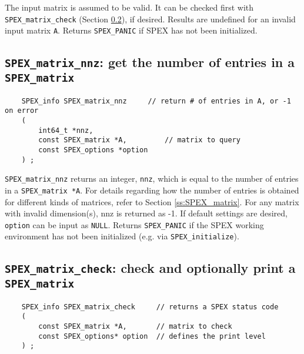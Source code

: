 \documentclass[12pt]{report}
\theoremstyle{definition}
\begin{document}
The input matrix is assumed to be valid. It can be checked first with
\verb|SPEX_matrix_check| (Section \ref{s:user:matrix_check}), if desired.
Results are undefined for an invalid input matrix \verb|A|.  Returns
\verb|SPEX_PANIC| if SPEX has not been initialized.

\cprotect\subsection{\verb|SPEX_matrix_nnz|: get the number of entries in a
\verb|SPEX_matrix|}
\label{s:user:matrix_nnz}

\begin{mdframed}[userdefinedwidth=6in]
{\footnotesize
\begin{verbatim}
    SPEX_info SPEX_matrix_nnz     // return # of entries in A, or -1 on error
    (
        int64_t *nnz,
        const SPEX_matrix *A,         // matrix to query
        const SPEX_options *option
    ) ;
\end{verbatim}
} \end{mdframed}

\verb|SPEX_matrix_nnz| returns an integer, \verb|nnz|, which is equal to the number of entries in a \verb|SPEX_matrix *A|.
For details regarding how the number of entries is obtained for different kinds
of matrices, refer to Section \ref{ss:SPEX_matrix}.
For any matrix with invalid dimension(s), nnz is returned as -1.
If default settings are desired, \verb|option| can be input as \verb|NULL|.
Returns \verb|SPEX_PANIC| if the SPEX working environment has not been initialized (e.g. via \verb|SPEX_initialize|).

\cprotect\subsection{\verb|SPEX_matrix_check|: check and optionally print a \verb|SPEX_matrix|}
\label{s:user:matrix_check}

\begin{mdframed}[userdefinedwidth=6in]
{\footnotesize
\begin{verbatim}
    SPEX_info SPEX_matrix_check     // returns a SPEX status code
    (
        const SPEX_matrix *A,       // matrix to check
        const SPEX_options* option  // defines the print level
    ) ;
\end{verbatim}
} \end{mdframed}
\end{document}
